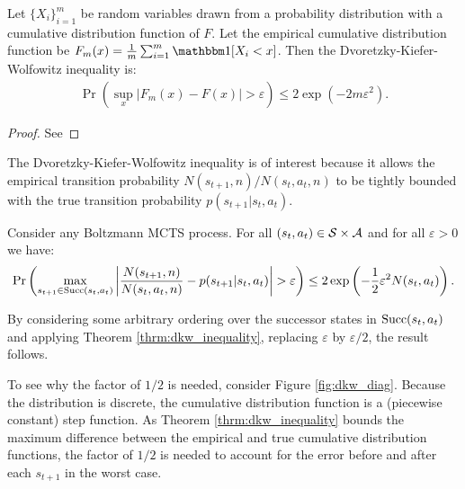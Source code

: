     

    \begin{theorem} \label{thrm:dkw_inequality}
        Let $\{X_i\}_{i=1}^m$ be random variables drawn from a probability distribution with a cumulative distribution function of $F$. Let the empirical cumulative distribution function be $F_m(x)=\frac{1}{m} \sum_{i=1}^m \one[X_i < x]$. Then the Dvoretzky-Kiefer-Wolfowitz inequality is:
        \begin{align}
            \Pr\left(\sup_x |F_m(x)-F(x)| > \varepsilon\right) \leq 2\exp\left(-2m\varepsilon^2\right).
        \end{align}
    \end{theorem}
    \begin{proof}
        See %
    \end{proof}







    

    The Dvoretzky-Kiefer-Wolfowitz inequality is of interest because it allows the empirical transition probability $N(s_{t+1},n)/N(s_t,a_t,n)$ to be tightly bounded with the true transition probability $p(s_{t+1}|s_t,a_t)$. 
    \begin{corollary} \label{cor:bound_transition_distribution}
        Consider any Boltzmann MCTS process. For all $(s_t,a_t)\in\mathcal{S}\times\mathcal{A}$ and for all $\varepsilon >0$ we have:
        \begin{align}
            \Pr\left(\max_{s_{t+1}\in{\textnormal{Succ}(s_t,a_t)}}\left| \frac{N(s_{t+1},n)}{N(s_t,a_t,n)} - p(s_{t+1}|s_t,a_t) \right| > \varepsilon \right) \leq 2 \exp\left(-\frac{1}{2}\varepsilon^2 N(s_t,a_t) \right).
        \end{align}
    \end{corollary}
    \begin{proofoutline}
        By considering some arbitrary ordering over the successor states in ${\textnormal{Succ}(s_t,a_t)}$ and applying Theorem \ref{thrm:dkw_inequality}, replacing $\varepsilon$ by $\varepsilon/2$, the result follows.

        To see why the factor of $1/2$ is needed, consider Figure \ref{fig:dkw_diag}. Because the distribution is discrete, the cumulative distribution function is a (piecewise constant) step function. As Theorem \ref{thrm:dkw_inequality} bounds the maximum difference between the empirical and true cumulative distribution functions, the factor of $1/2$ is needed to account for the error before and after each $s_{t+1}$ in the worst case.
    \end{proofoutline}









